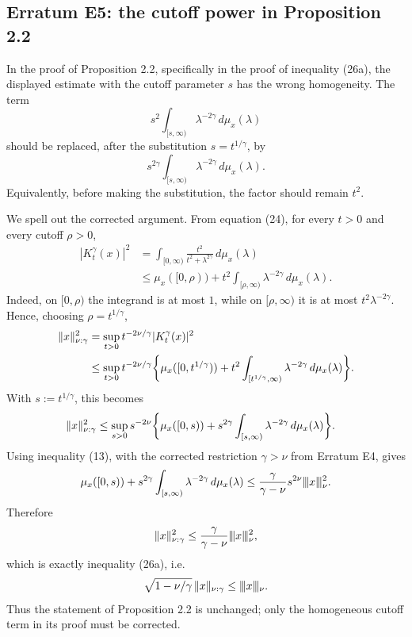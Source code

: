 
\subsection*{Erratum E5: the cutoff power in Proposition 2.2}
\label{s:erratum:E5}

In the proof of Proposition 2.2, specifically in the proof of
inequality (26a), the displayed estimate with the cutoff parameter $s$ has
the wrong homogeneity.  The term
\[
	s^2 \int_{[s,\infty)} \lambda^{-2\gamma}\,d\mu_x(\lambda)
\]
should be replaced, after the substitution $s=t^{1/\gamma}$, by
\[
	s^{2\gamma}
	\int_{[s,\infty)} \lambda^{-2\gamma}\,d\mu_x(\lambda).
\]
Equivalently, before making the substitution, the factor should remain $t^2$.

We spell out the corrected argument.  From equation (24), for every $t>0$
and every cutoff $\rho>0$,
\begin{align*}
	|K_t^\gamma(x)|^2
	&=
	\int_{[0,\infty)}
	\frac{t^2}{t^2+\lambda^{2\gamma}}\,d\mu_x(\lambda) \\
	&\leq
	\mu_x([0,\rho))
	+
	t^2\int_{[\rho,\infty)}\lambda^{-2\gamma}\,d\mu_x(\lambda).
\end{align*}
Indeed, on $[0,\rho)$ the integrand is at most $1$, while on
$[\rho,\infty)$ it is at most $t^2\lambda^{-2\gamma}$.  Hence, choosing
$\rho=t^{1/\gamma}$,
\begin{align*}
	\| x \|_{ \nu:\gamma }^2
	&=
	\sup_{t>0}t^{-2\nu/\gamma}|K_t^\gamma(x)|^2 \\
	&\leq
	\sup_{t>0}t^{-2\nu/\gamma}
	\biggl\{
		\mu_x([0,t^{1/\gamma}))
		+
		t^2\int_{[t^{1/\gamma},\infty)}
		\lambda^{-2\gamma}\,d\mu_x(\lambda)
	\biggr\}.
\end{align*}
With $s:=t^{1/\gamma}$, this becomes
\begin{align*}
	\| x \|_{ \nu:\gamma }^2
	&\leq
	\sup_{s>0}s^{-2\nu}
	\biggl\{
		\mu_x([0,s))
		+
		s^{2\gamma}
		\int_{[s,\infty)}\lambda^{-2\gamma}\,d\mu_x(\lambda)
	\biggr\}.
\end{align*}
Using inequality (13), with the corrected restriction $\gamma>\nu$ from
Erratum E4, gives
\[
	\mu_x([0,s))
	+
	s^{2\gamma}
	\int_{[s,\infty)}\lambda^{-2\gamma}\,d\mu_x(\lambda)
	\leq
	\frac{\gamma}{\gamma-\nu}s^{2\nu}\vert\kern-0.25ex\vert\kern-0.25ex\vert x \vert\kern-0.25ex \vert\kern-0.25ex\vert_{ \nu }^2 .
\]
Therefore
\[
	\| x \|_{ \nu:\gamma }^2
	\leq
	\frac{\gamma}{\gamma-\nu}\vert\kern-0.25ex\vert\kern-0.25ex\vert x \vert\kern-0.25ex \vert\kern-0.25ex\vert_{ \nu }^2,
\]
which is exactly inequality (26a), i.e.
\[
	\sqrt{1-\nu/\gamma}\,\| x \|_{ \nu:\gamma }
	\leq
	\vert\kern-0.25ex\vert\kern-0.25ex\vert x \vert\kern-0.25ex \vert\kern-0.25ex\vert_{ \nu }.
\]
Thus the statement of Proposition 2.2 is unchanged; only the
homogeneous cutoff term in its proof must be corrected.
